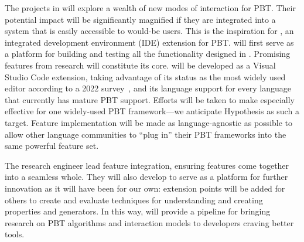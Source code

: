 The projects in  will explore a wealth of new modes of interaction
for PBT. Their potential impact will be significantly magnified if they are
integrated into a system
that is easily accessible to would-be users. This is the inspiration for
\tyche{}, an integrated development environment (IDE) extension for PBT.
\tyche{} will first serve as a platform for building and testing all the functionality designed in . Promising features from research will constitute its core.
\tyche{} will be developed as a Visual Studio Code extension, taking advantage of its status as the most widely used editor according to a 2022 survey~\cite{noauthor_stack_nodate}, and its language support for every language that currently has mature PBT support.
Efforts will be taken to make \tyche{} especially effective for one widely-used PBT framework---we anticipate Hypothesis as such a target. Feature implementation will be made as language-agnostic as possible to allow other language communities to ``plug in'' their PBT frameworks into the same powerful feature set.

The research engineer lead feature integration, ensuring features come together into a
seamless whole. They will also develop \tyche{} to serve as a platform for
further innovation as it will have been for our own: extension points will be added
for others to create and evaluate techniques for understanding and creating properties and generators.
In this way, \tyche{} will provide a pipeline for bringing research on
PBT algorithms and interaction models to developers craving better tools.

